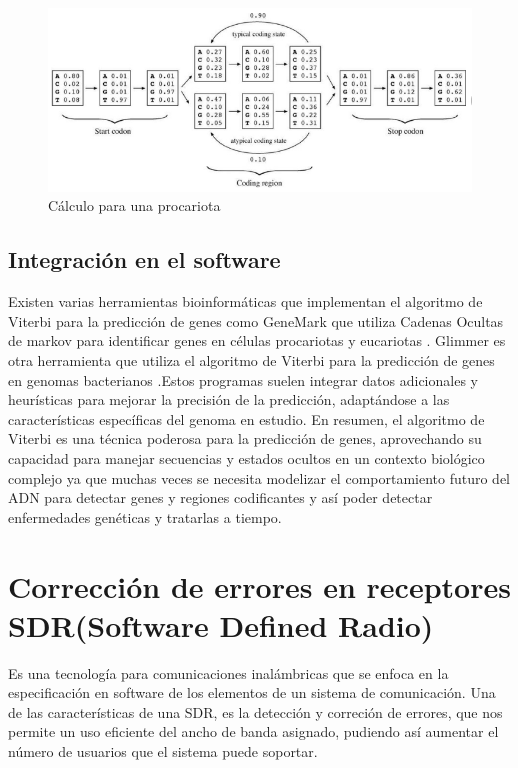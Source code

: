 \documentclass[11pt,openany]{book}
\begin{document}
\begin{figure}[H]
\centering
\begin{minipage}{.48\textwidth}
    \centering
    \includegraphics[width=1\linewidth]{assets/Img/dibujomarkov.png}
    \caption{Cálculo para una procariota}
    \label{fig:Uso del HMM}
\end{minipage}%
\end{figure}

\subsection*{Integración en el software}

Existen varias herramientas bioinformáticas que implementan el algoritmo de Viterbi para la predicción de genes como 
GeneMark que utiliza Cadenas Ocultas de markov para identificar genes en células procariotas y eucariotas . Glimmer es otra herramienta que utiliza el algoritmo de Viterbi para la predicción de genes en 
genomas bacterianos .Estos programas suelen integrar datos adicionales y heurísticas para mejorar la precisión de la predicción, adaptándose a las características específicas del genoma en estudio.
En resumen, el algoritmo de Viterbi es una técnica poderosa para la predicción de genes, aprovechando su capacidad para manejar secuencias y estados ocultos en un contexto biológico complejo ya que muchas 
veces se necesita modelizar el comportamiento futuro del ADN para detectar genes y regiones codificantes y así poder detectar enfermedades genéticas y tratarlas a tiempo.


\section{Corrección de errores en receptores SDR(Software Defined Radio)}
Es una tecnología para comunicaciones inalámbricas que se enfoca en la especificación en software de los 
elementos de un sistema de comunicación. Una de las características de una SDR, es la detección y correción de errores, que nos permite
un uso eficiente del ancho de banda asignado, pudiendo así aumentar el número de usuarios que el sistema puede soportar.
\end{document}
